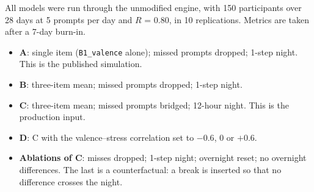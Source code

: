 \documentclass[11pt,letterpaper]{article}
\begin{document}
All models were run through the unmodified engine, with 150 participants over 28 days at 5 prompts per day and $R$ = 0.80, in 10 replications. Metrics are taken after a 7-day burn-in.
\begin{itemize}
    \item \textbf{A}: single item (\texttt{B1\_valence} alone); missed prompts dropped; 1-step night. This is the published simulation.
    \item \textbf{B}: three-item mean; missed prompts dropped; 1-step night.
    \item \textbf{C}: three-item mean; missed prompts bridged; 12-hour night. This is the production input.
    \item \textbf{D}: C with the valence--stress correlation set to $-0.6$, 0 or $+0.6$.
    \item \textbf{Ablations of C}: misses dropped; 1-step night; overnight reset; no overnight differences. The last is a counterfactual: a break is inserted so that no difference crosses the night.
\end{itemize}
\end{document}
